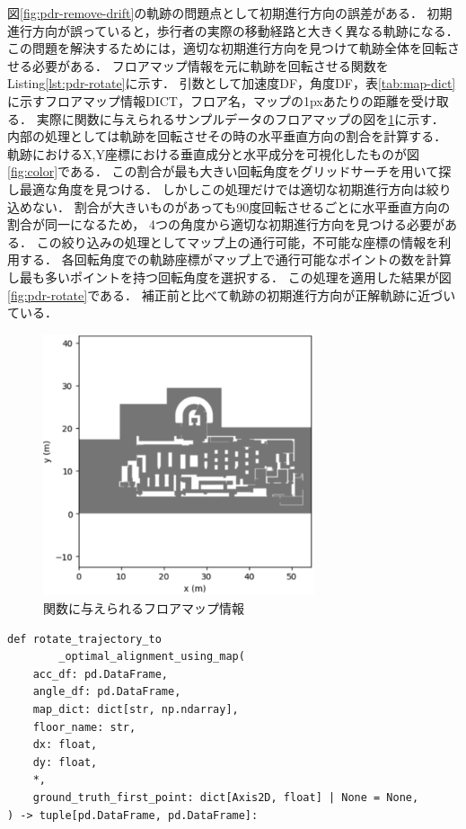 
図\ref{fig:pdr-remove-drift}の軌跡の問題点として初期進行方向の誤差がある．
初期進行方向が誤っていると，歩行者の実際の移動経路と大きく異なる軌跡になる．
この問題を解決するためには，適切な初期進行方向を見つけて軌跡全体を回転させる必要がある．
フロアマップ情報を元に軌跡を回転させる関数をListing\ref{lst:pdr-rotate}に示す．
引数として加速度DF，角度DF，表\ref{tab:map-dict}に示すフロアマップ情報DICT，フロア名，マップの1pxあたりの距離を受け取る．
実際に関数に与えられるサンプルデータのフロアマップの図を\ref{fig:floor-map}に示す．
内部の処理としては軌跡を回転させその時の水平垂直方向の割合を計算する．
軌跡におけるX,Y座標における垂直成分と水平成分を可視化したものが図\ref{fig:color}である．
この割合が最も大きい回転角度をグリッドサーチを用いて探し最適な角度を見つける．
しかしこの処理だけでは適切な初期進行方向は絞り込めない．
割合が大きいものがあっても90度回転させるごとに水平垂直方向の割合が同一になるため，
4つの角度から適切な初期進行方向を見つける必要がある．
この絞り込みの処理としてマップ上の通行可能，不可能な座標の情報を利用する．
各回転角度での軌跡座標がマップ上で通行可能なポイントの数を計算し最も多いポイントを持つ回転角度を選択する．
この処理を適用した結果が図\ref{fig:pdr-rotate}である．
補正前と比べて軌跡の初期進行方向が正解軌跡に近づいている．

\begin{figure}[ht]
	\centering
	\includegraphics[width=80mm]{image/floor-map.jpg}
	\caption{関数に与えられるフロアマップ情報}    \label{fig:floor-map}
\end{figure}


\begin{lstlisting}[caption={初期進行方向補正}, label=lst:pdr-rotate]
def rotate_trajectory_to
		_optimal_alignment_using_map(
    acc_df: pd.DataFrame,
    angle_df: pd.DataFrame,
    map_dict: dict[str, np.ndarray],
    floor_name: str,
    dx: float,
    dy: float,
    *,
    ground_truth_first_point: dict[Axis2D, float] | None = None,
) -> tuple[pd.DataFrame, pd.DataFrame]:
\end{lstlisting}

